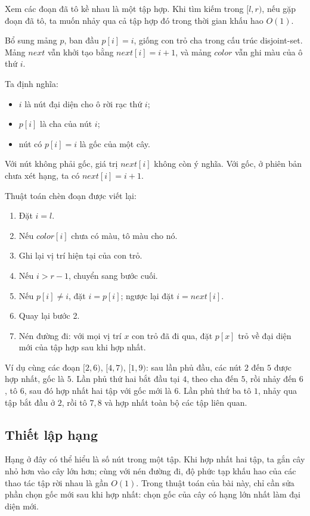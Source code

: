 \documentclass[11pt]{article}
\begin{document}
Xem các đoạn đã tô kề nhau là một tập hợp. Khi tìm kiếm trong \([l,r)\), nếu
gặp đoạn đã tô, ta muốn nhảy qua cả tập hợp đó trong thời gian khấu hao
\(O(1)\).

Bổ sung mảng \(p\), ban đầu \(p[i]=i\), giống con trỏ cha trong cấu trúc
disjoint-set. Mảng \(\mathit{next}\) vẫn khởi tạo bằng \(\mathit{next}[i]=i+1\),
và mảng \(\mathit{color}\) vẫn ghi màu của ô thứ \(i\).

Ta định nghĩa:
\begin{itemize}
  \item \(i\) là nút đại diện cho ô rời rạc thứ \(i\);
  \item \(p[i]\) là cha của nút \(i\);
  \item nút có \(p[i]=i\) là gốc của một cây.
\end{itemize}

Với nút không phải gốc, giá trị \(\mathit{next}[i]\) không còn ý nghĩa. Với
gốc, ở phiên bản chưa xét hạng, ta có \(\mathit{next}[i]=i+1\).

Thuật toán chèn đoạn được viết lại:
\begin{enumerate}
  \item Đặt \(i=l\).
  \item Nếu \(\mathit{color}[i]\) chưa có màu, tô màu cho nó.
  \item Ghi lại vị trí hiện tại của con trỏ.
  \item Nếu \(i>r-1\), chuyển sang bước cuối.
  \item Nếu \(p[i]\ne i\), đặt \(i=p[i]\); ngược lại đặt
  \(i=\mathit{next}[i]\).
  \item Quay lại bước 2.
  \item Nén đường đi: với mọi vị trí \(x\) con trỏ đã đi qua, đặt
  \(p[x]\) trỏ về đại diện mới của tập hợp sau khi hợp nhất.
\end{enumerate}

Ví dụ cùng các đoạn \([2,6)\), \([4,7)\), \([1,9)\): sau lần phủ đầu, các nút
\(2\) đến \(5\) được hợp nhất, gốc là \(5\). Lần phủ thứ hai bắt đầu tại \(4\),
theo cha đến \(5\), rồi nhảy đến \(6\), tô \(6\), sau đó hợp nhất hai tập với
gốc mới là \(6\). Lần phủ thứ ba tô \(1\), nhảy qua tập bắt đầu ở \(2\), rồi
tô \(7,8\) và hợp nhất toàn bộ các tập liên quan.

\subsection{Thiết lập hạng}

Hạng ở đây có thể hiểu là số nút trong một tập. Khi hợp nhất hai tập, ta gắn
cây nhỏ hơn vào cây lớn hơn; cùng với nén đường đi, độ phức tạp khấu hao của
các thao tác tập rời nhau là gần \(O(1)\). Trong thuật toán của bài này, chỉ
cần sửa phần chọn gốc mới sau khi hợp nhất: chọn gốc của cây có hạng lớn nhất
làm đại diện mới.
\end{document}
